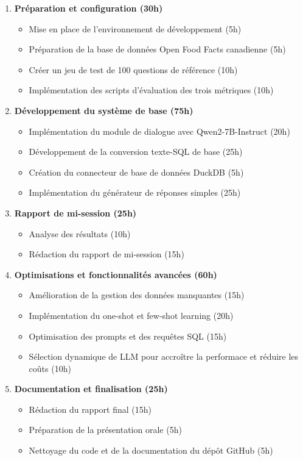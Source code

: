\documentclass[a4paper,11pt]{article}
\begin{document}
\begin{enumerate}
    \item \textbf{Préparation et configuration (30h)}
    \begin{itemize}
        \item Mise en place de l'environnement de développement (5h)
        \item Préparation de la base de données Open Food Facts canadienne (5h)
        \item Créer un jeu de test de 100 questions de référence (10h)
        \item Implémentation des scripts d'évaluation des trois métriques (10h)
    \end{itemize}

    \item \textbf{Développement du système de base (75h)}
    \begin{itemize}
        \item Implémentation du module de dialogue avec Qwen2-7B-Instruct (20h)
        \item Développement de la conversion texte-SQL de base (25h)
        \item Création du connecteur de base de données DuckDB (5h)
        \item Implémentation du générateur de réponses simples (25h)
    \end{itemize}

    \item \textbf{Rapport de mi-session (25h)}
    \begin{itemize}
        \item Analyse des résultats (10h)
        \item Rédaction du rapport de mi-session (15h)
    \end{itemize}

    \item \textbf{Optimisations et fonctionnalités avancées (60h)}
    \begin{itemize}
        \item Amélioration de la gestion des données manquantes (15h)
        \item Implémentation du one-shot et few-shot learning (20h)
        \item Optimisation des prompts et des requêtes SQL (15h)
        \item Sélection dynamique de LLM pour accroître la performace et réduire les coûts (10h)
    \end{itemize}

    \item \textbf{Documentation et finalisation (25h)}
    \begin{itemize}
        \item Rédaction du rapport final (15h)
        \item Préparation de la présentation orale (5h)
        \item Nettoyage du code et de la documentation du dépôt GitHub (5h)
    \end{itemize}
\end{enumerate}
\end{document}
